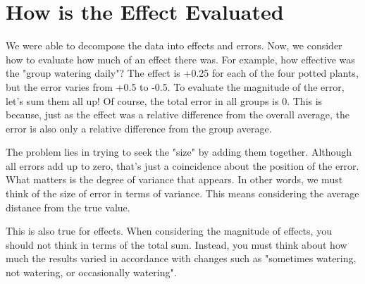 \documentclass{ltjbook}
\begin{document}
\section{How is the Effect Evaluated}
\label{HowToEvaluateTheDifference}
We were able to decompose the data into effects and errors. Now, we consider how to evaluate how much of an effect there was.
For example, how effective was the "group watering daily"? The effect is +0.25 for each of the four potted plants, but the error varies from +0.5 to -0.5. To evaluate the magnitude of the error, let's sum them all up! Of course, the total error in all groups is 0. This is because, just as the effect was a relative difference from the overall average, the error is also only a relative difference from the group average.

The problem lies in trying to seek the "size" by adding them together. Although all errors add up to zero, that's just a coincidence about the position of the error. What matters is the degree of variance that appears. In other words, we must think of the size of error in terms of variance. This means considering the average distance from the true value.

This is also true for effects. When considering the magnitude of effects, you should not think in terms of the total sum. Instead, you must think about how much the results varied in accordance with changes such as "sometimes watering, not watering, or occasionally watering".
\end{document}
